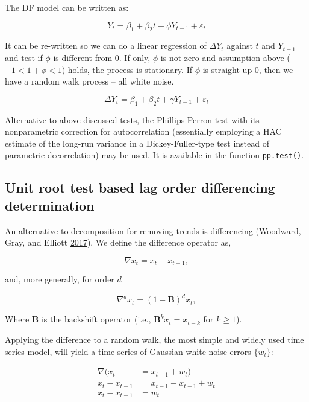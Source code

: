 \documentclass[
  12pt,
]{article}
\begin{document}
The DF model can be written as:

\[
Y_t = \beta_1 + \beta_2 t + \phi Y_{t-1} + \varepsilon_t
\]

It can be re-written so we can do a linear regression of \(\Delta Y_t\) against \(t\) and \(Y_{t-1}\) and test if \(\phi\) is different from 0. If only, \(\phi\) is not zero and assumption above (\(-1 < 1+\phi < 1\)) holds, the process is stationary. If \(\phi\) is straight up 0, then we have a random walk process -- all white noise.

\[
\Delta {Y}_{t}=\beta_1+\beta_2 t+\gamma {Y}_{t-1} + \varepsilon_{t}
\]

Alternative to above discussed tests, the Phillips-Perron test with its nonparametric correction for autocorrelation (essentially employing a HAC estimate of the long-run variance in a Dickey-Fuller-type test instead of parametric decorrelation) may be used. It is available in the function \texttt{pp.test()}.

\hypertarget{unit-root-test-based-lag-order-differencing-determination}{%
\subsection{Unit root test based lag order differencing determination}\label{unit-root-test-based-lag-order-differencing-determination}}

An alternative to decomposition for removing trends is differencing (Woodward, Gray, and Elliott \protect\hyperlink{ref-woodward2017applied}{2017}). We define the difference operator as,

\begin{equation}
\nabla x_t = x_t - x_{t-1},
\label{eqn:difference-operator}
\end{equation}

and, more generally, for order \(d\)

\begin{equation}
\nabla^d x_t = (1-\mathbf{B})^d x_t,
\label{eqn:order-d-difference-operator}
\end{equation}

Where \(\mathbf{B}\) is the backshift operator (i.e., \(\mathbf{B}^k x_t = x_{t-k}\) for \(k \geq 1\)).

Applying the difference to a random walk, the most simple and widely used time series model, will yield a time series of Gaussian white noise errors \(\{w_t\}\):

\begin{equation}
  \begin{aligned}
    \nabla (x_t &= x_{t-1} + w_t) \\
    x_t - x_{t-1} &= x_{t-1} - x_{t-1} + w_t \\
    x_t - x_{t-1} &= w_t
  \end{aligned}
  \label{eqn:random-walk-series}
\end{equation}
\end{document}
